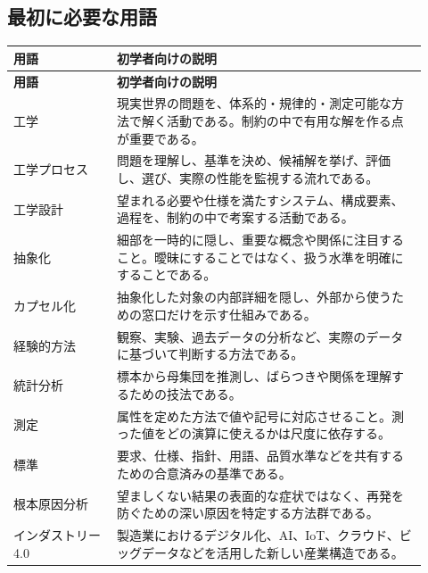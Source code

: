 \documentclass[uplatex,dvipdfmx,a4paper,11pt]{jsarticle}
\begin{document}
\subsection{最初に必要な用語}
\begin{longtable}{>{\raggedright\arraybackslash}p{0.23\linewidth}>{\raggedright\arraybackslash}p{0.69\linewidth}}
\toprule
\textbf{用語} & \textbf{初学者向けの説明} \\
\midrule
\endfirsthead
\toprule
\textbf{用語} & \textbf{初学者向けの説明} \\
\midrule
\endhead
工学 & 現実世界の問題を、体系的・規律的・測定可能な方法で解く活動である。制約の中で有用な解を作る点が重要である。 \\
工学プロセス & 問題を理解し、基準を決め、候補解を挙げ、評価し、選び、実際の性能を監視する流れである。 \\
工学設計 & 望まれる必要や仕様を満たすシステム、構成要素、過程を、制約の中で考案する活動である。 \\
抽象化 & 細部を一時的に隠し、重要な概念や関係に注目すること。曖昧にすることではなく、扱う水準を明確にすることである。 \\
カプセル化 & 抽象化した対象の内部詳細を隠し、外部から使うための窓口だけを示す仕組みである。 \\
経験的方法 & 観察、実験、過去データの分析など、実際のデータに基づいて判断する方法である。 \\
統計分析 & 標本から母集団を推測し、ばらつきや関係を理解するための技法である。 \\
測定 & 属性を定めた方法で値や記号に対応させること。測った値をどの演算に使えるかは尺度に依存する。 \\
標準 & 要求、仕様、指針、用語、品質水準などを共有するための合意済みの基準である。 \\
根本原因分析 & 望ましくない結果の表面的な症状ではなく、再発を防ぐための深い原因を特定する方法群である。 \\
インダストリー4.0 & 製造業におけるデジタル化、AI、IoT、クラウド、ビッグデータなどを活用した新しい産業構造である。 \\
\bottomrule
\end{longtable}
\end{document}
